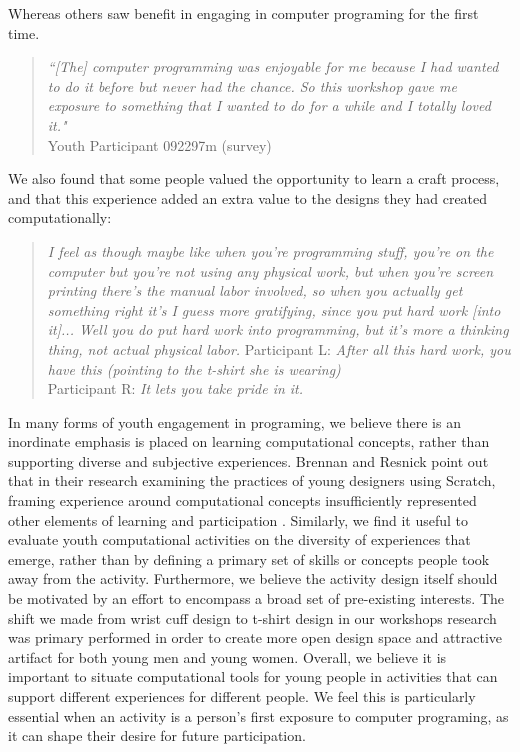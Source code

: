 \documentclass{sigchi}
\begin{document}
Whereas others saw benefit in engaging in computer programing for the first time.
\begin{quotation}
\textit{``[The] computer programming was enjoyable for me because I had wanted to do it before but never had the chance. So this workshop gave me exposure to something that I wanted to do for a while and I totally loved it."}
\\Youth Participant 092297m (survey)
\end{quotation}

We also found that some people valued the opportunity to learn a craft process, and that this experience added an extra value to the designs they had created computationally:
\begin{quotation}
\textit{I feel as though maybe like when you're programming stuff, you're on the computer but you're not using any physical work, but when you're screen printing there's the manual labor involved, so when you actually get something right it's I guess more gratifying, since you put hard work [into it]... Well you do put hard work into programming, but it's more a thinking thing, not actual physical labor.}
Participant L: \textit{After all this hard work, you have this (pointing to the t-shirt she is wearing)}
\\Participant R: \textit{It lets you take pride in it.}
\end{quotation}


In many forms of youth engagement in programing, we believe there is an inordinate emphasis is placed on learning computational concepts, rather than supporting diverse and subjective experiences. Brennan and Resnick point out that in their research examining the practices of young designers using Scratch, framing experience around computational concepts insufficiently represented other elements of learning and participation \cite{computational_thinking}. Similarly, we find it useful to evaluate youth computational activities on the diversity of experiences that emerge, rather than by defining a primary set of skills or concepts people took away from the activity. Furthermore, we believe the activity design itself should be motivated by an effort to encompass a broad set of pre-existing interests. The shift we made from wrist cuff design to t-shirt design in our workshops research was primary performed in order to create more open design space and attractive artifact for both young men and young women. Overall, we believe it is important to situate computational tools for young people in activities that can support different experiences for different people. We feel this is particularly essential when an activity is a person's first exposure to computer programing, as it can shape their desire for future participation. 
\end{document}
